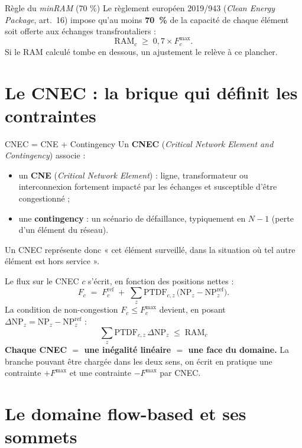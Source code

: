 \documentclass[11pt,a4paper]{article}
\newcommand{\NP}{\mathrm{NP}}
\newcommand{\PTDF}{\mathrm{PTDF}}
\newcommand{\RAM}{\mathrm{RAM}}
\newcommand{\Fmax}{F^{\max}}
\newcommand{\Fref}{F^{\mathrm{ref}}}
\begin{document}
\begin{rembox}{Règle du \textit{minRAM} (70 \%)}
Le règlement européen 2019/943 (\emph{Clean Energy Package}, art.~16) impose
qu'au moins \textbf{70~\%} de la capacité de chaque élément soit offerte aux
échanges transfrontaliers :
\[
  \RAM_c \;\ge\; 0{,}7 \times \Fmax_c .
\]
Si le RAM calculé tombe en dessous, un ajustement le relève à ce plancher.
\end{rembox}

\section{Le CNEC : la brique qui définit les contraintes}

\begin{defbox}{CNEC = CNE + Contingency}
Un \textbf{CNEC} (\emph{Critical Network Element and Contingency}) associe :
\begin{itemize}[nosep,leftmargin=1.4em]
  \item un \textbf{CNE} (\emph{Critical Network Element}) : ligne,
        transformateur ou interconnexion fortement impacté par les échanges
        et susceptible d'être congestionné ;
  \item une \textbf{contingency} : un scénario de défaillance, typiquement
        en $N\!-\!1$ (perte d'un élément du réseau).
\end{itemize}
Un CNEC représente donc « cet élément surveillé, dans la situation où tel
autre élément est hors service ».
\end{defbox}

Le flux sur le CNEC $c$ s'écrit, en fonction des positions nettes :
\[
  F_c \;=\; \Fref_c \;+\; \sum_z \PTDF_{c,z}\,\bigl(\NP_z - \NP_z^{\mathrm{ref}}\bigr).
\]
La condition de non-congestion $F_c \le \Fmax_c$ devient, en posant
$\Delta\NP_z = \NP_z - \NP_z^{\mathrm{ref}}$ :
\[
  \boxed{\;\sum_z \PTDF_{c,z}\,\Delta\NP_z \;\le\; \RAM_c\;}
\]
\textbf{Chaque CNEC $=$ une inégalité linéaire $=$ une face du domaine.}
La branche pouvant être chargée dans les deux sens, on écrit en pratique
une contrainte $+\Fmax$ et une contrainte $-\Fmax$ par CNEC.

\section{Le domaine flow-based et ses sommets}
\end{document}
